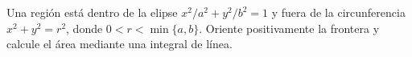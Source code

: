 Una región está dentro de la elipse $x^2/a^2+y^2/b^2=1$ y fuera de la circunferencia $x^2+y^2=r^2$, donde $0<r<\min\{a,b\}$. Oriente positivamente la frontera y calcule el área mediante una integral de línea.

